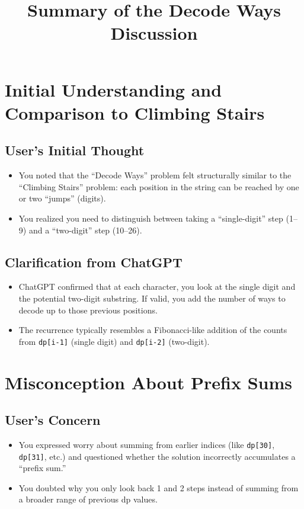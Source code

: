 \documentclass[12pt]{article}
\title{Summary of the Decode Ways Discussion}
\author{}
\date{}
\begin{document}
\maketitle

\section{Initial Understanding and Comparison to Climbing Stairs}

\subsection{User’s Initial Thought}
\begin{itemize}[leftmargin=*, label={--}]
    \item You noted that the ``Decode Ways'' problem felt structurally similar to the ``Climbing Stairs'' problem: each position in the string can be reached by one or two ``jumps'' (digits).
    \item You realized you need to distinguish between taking a ``single-digit'' step (1--9) and a ``two-digit'' step (10--26).
\end{itemize}

\subsection{Clarification from ChatGPT}
\begin{itemize}[leftmargin=*, label={--}]
    \item ChatGPT confirmed that at each character, you look at the single digit and the potential two-digit substring. If valid, you add the number of ways to decode up to those previous positions.
    \item The recurrence typically resembles a Fibonacci-like addition of the counts from \texttt{dp[i-1]} (single digit) and \texttt{dp[i-2]} (two-digit).
\end{itemize}

\section{Misconception About Prefix Sums}

\subsection{User’s Concern}
\begin{itemize}[leftmargin=*, label={--}]
    \item You expressed worry about summing from earlier indices (like \texttt{dp[30]}, \texttt{dp[31]}, etc.) and questioned whether the solution incorrectly accumulates a ``prefix sum.''
    \item You doubted why you only look back 1 and 2 steps instead of summing from a broader range of previous dp values.
\end{itemize}
\end{document}
